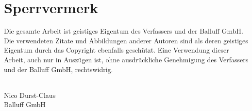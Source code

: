 \thispagestyle{empty}

\section*{Sperrvermerk}

Die gesamte Arbeit ist geistiges Eigentum des Verfassers und der Balluff GmbH. Die
verwendeten Zitate und Abbildungen anderer Autoren sind als deren geistiges Eigentum
durch das Copyright ebenfalls geschützt. Eine Verwendung dieser Arbeit, auch nur in
Auszügen ist, ohne ausdrückliche Genehmigung des Verfassers und der Balluff GmbH,
rechtswidrig.

\begin{center}
\textsuperscript{\textcopyright}\\
Nico Durst-Claus\\
Balluff GmbH\\
\end{center}

\cleardoubleemptypage{}